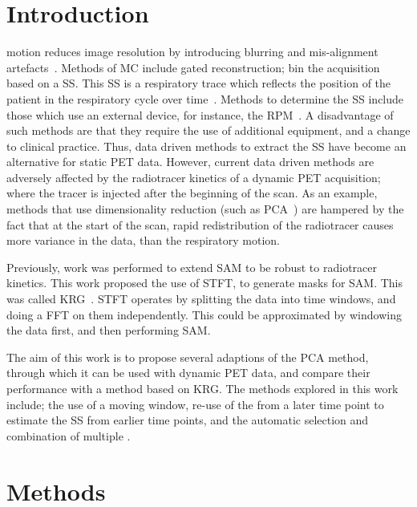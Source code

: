 \section{Introduction} \label{sec:introduction}
     motion reduces image resolution by introducing blurring and mis-alignment artefacts~\cite{Nehmeh2008a}. Methods of \gls{MC} include gated reconstruction; bin the acquisition based on a \gls{SS}. This \gls{SS} is a respiratory trace which reflects the position of the patient in the respiratory cycle over time~\cite{Kesner2010AMethods, Kesner2013GatingPET}. Methods to determine the \gls{SS} include those which use an external device, for instance, the \gls{RPM}~\cite{Bettinardi2013Motion-trackingPET/CT}. A disadvantage of such methods are that they require the use of additional equipment, and a change to clinical practice. Thus, data driven methods to extract the \gls{SS} have become an alternative for static \acrshort{PET} data. However, current data driven methods are adversely affected by the radiotracer kinetics of a dynamic \acrshort{PET} acquisition; where the tracer is injected after the beginning of the scan. As an example, methods that use dimensionality reduction (such as \acrshort{PCA}~\cite{Thielemans2011, Bertolli2018Data-DrivenTomography}) are hampered by the fact that at the start of the scan, rapid redistribution of the radiotracer causes more variance in the data, than the respiratory motion.
    
    Previously, work was performed to extend \gls{SAM} to be robust to radiotracer kinetics. This work proposed the use of \gls{STFT}, to generate masks for \gls{SAM}. This was called \gls{KRG}~\cite{Schleyer2014}. \gls{STFT} operates by splitting the data into time windows, and doing a \acrlong{FFT} on them independently. This could be approximated by windowing the data first, and then performing \gls{SAM}.
    
    The aim of this work is to propose several adaptions of the \acrshort{PCA} method, through which it can be used with dynamic \acrshort{PET} data, and compare their performance with a method based on \gls{KRG}. The methods explored in this work include; the use of a moving window, re-use of the  from a later time point to estimate the \gls{SS} from earlier time points, and the automatic selection and combination of multiple .

\vspace{-0.5cm}
    
\section{Methods} \label{sec:methods}
